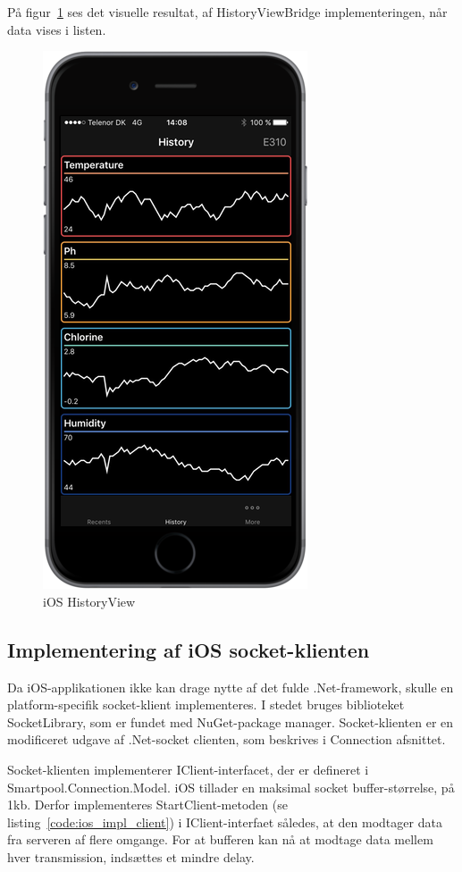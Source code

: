 På figur~\ref{fig:ios_imp_historyview} ses det visuelle resultat, af HistoryViewBridge implementeringen, når data vises i listen.

\begin{figure}
	\centering
	\includegraphics[width=0.4\linewidth]{figs/implementering/ios_imp_historyview}
	\caption{iOS HistoryView}
	\label{fig:ios_imp_historyview}
\end{figure}

\subsection{Implementering af iOS socket-klienten}
Da iOS-applikationen ikke kan drage nytte af det fulde .Net-framework, skulle en platform-specifik socket-klient implementeres. I stedet bruges biblioteket SocketLibrary, som er fundet med NuGet-package manager. Socket-klienten er en modificeret udgave af .Net-socket clienten, som beskrives i Connection afsnittet.

Socket-klienten implementerer IClient-interfacet, der er defineret i Smartpool.Connection.Model. iOS tillader en maksimal socket buffer-størrelse, på 1kb. Derfor implementeres StartClient-metoden (se listing~\ref{code:ios_impl_client}) i IClient-interfaet således, at den modtager data fra serveren af flere omgange. For at bufferen kan nå at modtage data mellem hver transmission, indsættes et mindre delay.

